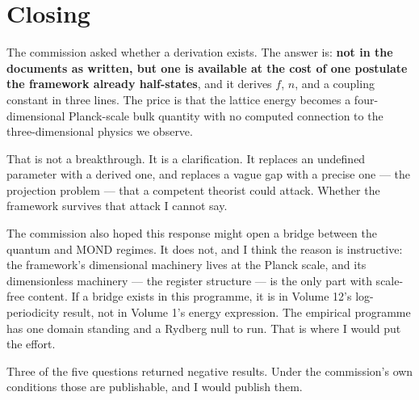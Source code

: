 \documentclass[11pt,letterpaper]{article}
\begin{document}
\section{Closing}

The commission asked whether a derivation exists. The answer is: \textbf{not in the documents
as written, but one is available at the cost of one postulate the framework already
half-states}, and it derives $f$, $n$, and a coupling constant in three lines. The price is
that the lattice energy becomes a four-dimensional Planck-scale bulk quantity with no
computed connection to the three-dimensional physics we observe.

That is not a breakthrough. It is a clarification. It replaces an undefined parameter with a
derived one, and replaces a vague gap with a precise one --- the projection problem --- that
a competent theorist could attack. Whether the framework survives that attack I cannot say.

The commission also hoped this response might open a bridge between the quantum and MOND
regimes. It does not, and I think the reason is instructive: the framework's dimensional
machinery lives at the Planck scale, and its dimensionless machinery --- the register
structure --- is the only part with scale-free content. If a bridge exists in this programme,
it is in Volume 12's log-periodicity result, not in Volume 1's energy expression. The
empirical programme has one domain standing and a Rydberg null to run. That is where I would
put the effort.

\medskip
\noindent Three of the five questions returned negative results. Under the commission's own
conditions those are publishable, and I would publish them.
\end{document}
